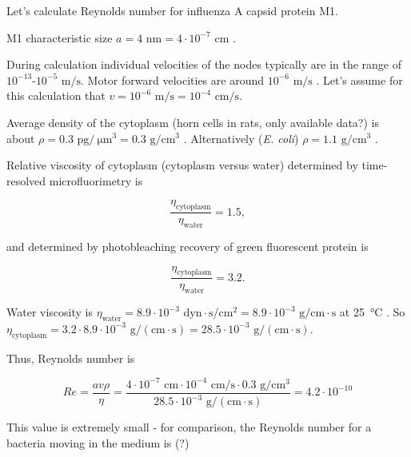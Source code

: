 Let's calculate Reynolds number for influenza A capsid protein M1.

M1 characteristic size $a = 4 \text{ nm} = 4 \cdot 10^{-7} \text{ cm}$ \cite{shtykova2013structural}.

During calculation individual velocities of the nodes typically are in the range of $10^{-13}$-$10^{-5} \text{ m/s}$. Motor forward velocities are around $10^{-6} \text{ m/s}$ \cite{muller2008tug}. Let's assume for this calculation that $v = 10^{-6} \text{ m/s} = 10^{-4} \text{ cm/s}$.

Average density of the cytoplasm (horn cells in rats, only available data?) is about $\rho = 0.3 \text{ pg}/\SI{}{\micro\meter}^3 = 0.3 \text{ g}/\text{cm}^3$ \cite{hartmann1967cytoplasmic}. Alternatively (\textit{E. coli}) $\rho = 1.1 \text{ g}/\text{cm}^3$ \cite{loferer1998determination}.

Relative viscosity of cytoplasm (cytoplasm versus water) determined by time-resolved microfluorimetry \cite{swaminathan1997photobleaching} is

\begin{equation}
\frac{\eta_\text{cytoplasm}}{\eta_\text{water}} = 1.5,
\end{equation}

and determined by photobleaching recovery of green fluorescent protein \cite{swaminathan1997photobleaching} is 

\begin{equation}
\frac{\eta_\text{cytoplasm}}{\eta_\text{water} }= 3.2.
\end{equation}

Water viscosity is $\eta_\text{water} = 8.9 \cdot 10^{-3} \text{ dyn} \cdot \text{s}/\text{cm}^2 = 8.9 \cdot 10^{-3} \text{ g}/\text{cm} \cdot \text{s} $ at \SI{25}{\degreeCelsius} \cite{IAPWS2008}. So $\eta_\text{cytoplasm} = 3.2 \cdot 8.9 \cdot 10^{-3} \text{ g}/(\text{cm} \cdot \text{s}) = 28.5 \cdot 10^{-3} \text{ g}/(\text{cm} \cdot \text{s})$.

Thus, Reynolds number is

\begin{equation}
Re = \frac{av\rho}{\eta} = \frac{4 \cdot 10^{-7} \text{ cm} \cdot 10^{-4} \text{ cm/s} \cdot 0.3 \text{ g}/\text{cm}^3}{28.5 \cdot 10^{-3} \text{ g}/(\text{cm} \cdot \text{s})} = 4.2 \cdot 10^{-10}
\end{equation}

This value is extremely small - for comparison, the Reynolds number for a bacteria moving in the medium is (?)

